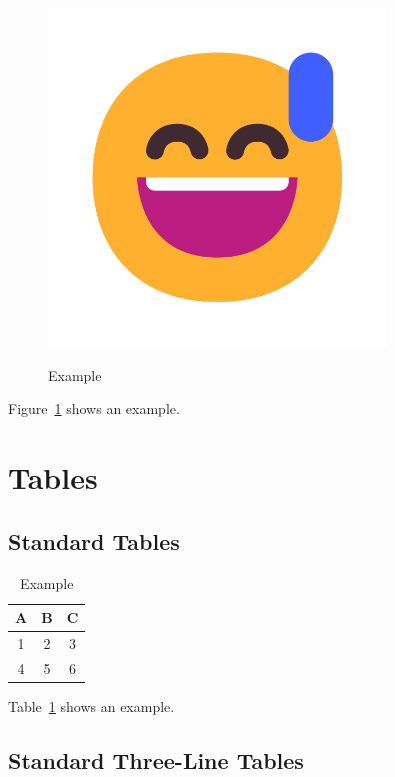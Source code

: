 \documentclass[letterpaper]{article}
\begin{document}
\begin{figure}
\begin{minipage}[b]{0.3\textwidth}
        \includegraphics[width=0.8\textwidth]{assets/example.pdf}
        \label{fig:grid2}
    \end{minipage}
    \caption{Example}
\end{figure}

Figure~\ref{fig:grid2} shows an example.

\section{Tables}


\subsection{Standard Tables}

\begin{table}
    \centering
    \begin{tabular}{|c|c|c|}
        \hline
        A & B & C \\
        \hline
        1 & 2 & 3 \\
        4 & 5 & 6 \\
        \hline
    \end{tabular}
    \caption{Example}
    \label{tab:standard}
\end{table}

Table~\ref{tab:standard} shows an example.


\subsection{Standard Three-Line Tables}
\end{document}
